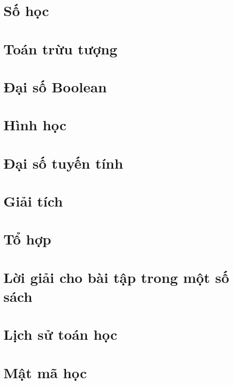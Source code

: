 \documentclass[oneside]{book}
\begin{document}
\part{Số học}



\part{Toán trừu tượng}





\part{Đại số Boolean}


\part{Hình học}



\part{Đại số tuyến tính}



\part{Giải tích}



\part{Tổ hợp}


\part{Lời giải cho bài tập trong một số sách}




\part{Lịch sử toán học}


\part{Mật mã học}





\medskip


\end{document}
